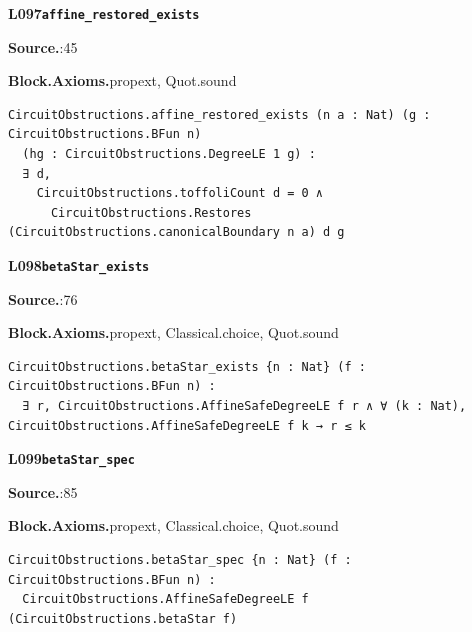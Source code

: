 \par\medskip\noindent\begin{minipage}{\textwidth}
{\small\bfseries L097\enspace\texttt{affine\_restored\_exists}\par}
{\footnotesize\raggedright\textbf{Source.}\enspace{}:45\par
\textbf{Block.}\quad\textbf{Axioms.}\enspace propext, Quot.sound\par}\nopagebreak
\begin{lstlisting}
CircuitObstructions.affine_restored_exists (n a : Nat) (g : CircuitObstructions.BFun n)
  (hg : CircuitObstructions.DegreeLE 1 g) :
  ∃ d,
    CircuitObstructions.toffoliCount d = 0 ∧
      CircuitObstructions.Restores (CircuitObstructions.canonicalBoundary n a) d g
\end{lstlisting}
\end{minipage}\par

\par\medskip\noindent\begin{minipage}{\textwidth}
{\small\bfseries L098\enspace\texttt{betaStar\_exists}\par}
{\footnotesize\raggedright\textbf{Source.}\enspace{}:76\par
\textbf{Block.}\quad\textbf{Axioms.}\enspace propext, Classical.choice, Quot.sound\par}\nopagebreak
\begin{lstlisting}
CircuitObstructions.betaStar_exists {n : Nat} (f : CircuitObstructions.BFun n) :
  ∃ r, CircuitObstructions.AffineSafeDegreeLE f r ∧ ∀ (k : Nat), CircuitObstructions.AffineSafeDegreeLE f k → r ≤ k
\end{lstlisting}
\end{minipage}\par

\par\medskip\noindent\begin{minipage}{\textwidth}
{\small\bfseries L099\enspace\texttt{betaStar\_spec}\par}
{\footnotesize\raggedright\textbf{Source.}\enspace{}:85\par
\textbf{Block.}\quad\textbf{Axioms.}\enspace propext, Classical.choice, Quot.sound\par}\nopagebreak
\begin{lstlisting}
CircuitObstructions.betaStar_spec {n : Nat} (f : CircuitObstructions.BFun n) :
  CircuitObstructions.AffineSafeDegreeLE f (CircuitObstructions.betaStar f)
\end{lstlisting}
\end{minipage}\par

